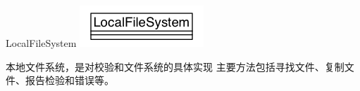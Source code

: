 \begin{XeClass}{LocalFileSystem}
\includegraphics[width=\textwidth]{cdig/LocalFileSystem.png}
     
 本地文件系统，是对校验和文件系统的具体实现
 主要方法包括寻找文件、复制文件、报告检验和错误等。

\end{XeClass}
